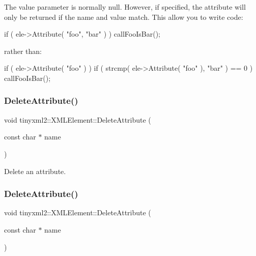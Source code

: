 The \textquotesingle{}value\textquotesingle{} parameter is normally null. However, if specified, the attribute will only be returned if the \textquotesingle{}name\textquotesingle{} and \textquotesingle{}value\textquotesingle{} match. This allow you to write code\+:

\begin{DoxyVerb}if ( ele->Attribute( "foo", "bar" ) ) callFooIsBar();
\end{DoxyVerb}


rather than\+: \begin{DoxyVerb}if ( ele->Attribute( "foo" ) ) {
    if ( strcmp( ele->Attribute( "foo" ), "bar" ) == 0 ) callFooIsBar();
}
\end{DoxyVerb}
 \mbox{\label{classtinyxml2_1_1XMLElement_aebd45aa7118964c30b32fe12e944628a}} 
\subsubsection{\texorpdfstring{Delete\+Attribute()}{DeleteAttribute()}\hspace{0.1cm}{\footnotesize\ttfamily [1/2]}}
{\footnotesize\ttfamily void tinyxml2\+::\+X\+M\+L\+Element\+::\+Delete\+Attribute (\begin{DoxyParamCaption}\item[{const char $\ast$}]{name }\end{DoxyParamCaption})}

Delete an attribute. \mbox{\label{classtinyxml2_1_1XMLElement_aebd45aa7118964c30b32fe12e944628a}} 
\subsubsection{\texorpdfstring{Delete\+Attribute()}{DeleteAttribute()}\hspace{0.1cm}{\footnotesize\ttfamily [2/2]}}
{\footnotesize\ttfamily void tinyxml2\+::\+X\+M\+L\+Element\+::\+Delete\+Attribute (\begin{DoxyParamCaption}\item[{const char $\ast$}]{name }\end{DoxyParamCaption})}

